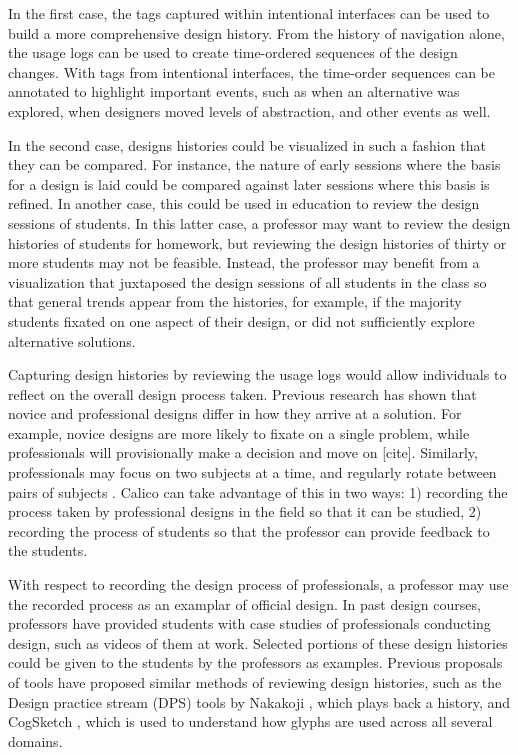 In the first case, the tags captured within intentional interfaces can be used to build a more comprehensive design history. From the history of navigation alone, the usage logs can be used to create time-ordered sequences of the design changes. With tags from intentional interfaces, the time-order sequences can be annotated to highlight important events, such as when an alternative was explored, when designers moved levels of abstraction, and other events as well. 

In the second case, designs histories could be visualized in such a fashion that they can be compared. For instance, the nature of early sessions where the basis for a design is laid could be compared against later sessions where this basis is refined. In another case, this could be used in education to review the design sessions of students. In this latter case, a professor may want to review the design histories of students for homework, but reviewing the design histories of thirty or more students may not be feasible. Instead, the professor may benefit from a visualization that juxtaposed the design sessions of all students in the class so that general trends appear from the histories, for example, if the majority students fixated on one aspect of their design, or did not sufficiently explore alternative solutions.

Capturing design histories by reviewing the usage logs would allow individuals to reflect on the overall design process taken. Previous research has shown that novice and professional designs differ in how they arrive at a solution. For example, novice designs are more likely to fixate on a single problem, while professionals will provisionally make a decision and move on [cite]. Similarly, professionals may focus on two subjects at a time, and regularly rotate between pairs of subjects \cite{Baker2010590}. 
Calico can take advantage of this in two ways: 1) recording the process taken by professional designs in the field so that it can be studied, 2) recording the process of students so that the professor can provide feedback to the students.

With respect to recording the design process of professionals, a professor may use the recorded process as an examplar of official design. In past design courses, professors have provided students with case studies of professionals conducting design, such as videos of them at work. Selected portions of these design histories could be given to the students by the professors as examples. Previous proposals of tools have proposed similar methods of reviewing design histories, such as the Design practice stream (DPS) tools by Nakakoji \cite{Nakakoji6035659}, which plays back a history, and CogSketch \cite{Forbus1149}, which is used to understand how glyphs are used across all several domains.


